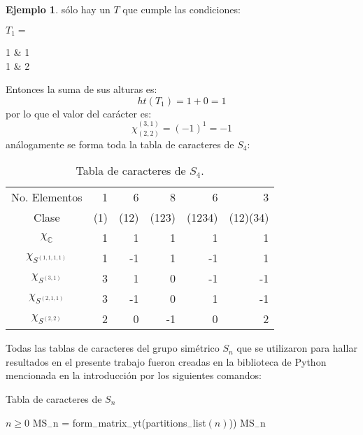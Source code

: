 \documentclass[12pt]{book}
\theoremstyle{definition}
\newtheorem{example}[theorem]{Ejemplo}
\newcounter{in}
\begin{document}
\begin{example}
sólo hay un $T$ que cumple las condiciones:
\begin{center}  
  $T_1=$
  \begin{ytableau}
    1 & 1  \\
    1 & 2
  \end{ytableau}\qquad
\end{center}
Entonces la suma de sus alturas es:
$$ht(T_1) = 1 + 0 = 1$$
por lo que el valor del carácter es:
$$\chi_{(2,2)}^{(3,1)} = (-1)^{1} = -1$$
análogamente se forma toda la tabla de caracteres de $S_{4}$:
\begin{table}[H]
  \centering
  \begin{tabular}{c|r r r r r}
    No. Elementos & 1 & 6 & 8 & 6 & 3 \\
    Clase & (1) & (12) & (123) & (1234) &(12)(34)\\
    \hline
    $\chi_{\mathbb{C}}$ & 1 & 1 & 1 & 1 & 1 \\
    $\chi_{S^{(1,1,1,1)}}$ & 1 & -1 & 1 & -1 & 1\\
    $\chi_{S^{(3,1)}}$ & 3 & 1 & 0 & -1 & -1\\
    $\chi_{S^{(2,1,1)}}$ & 3 & -1 & 0 & 1 & -1 \\
    $\chi_{S^{(2,2)}}$ & 2 & 0 & -1 & 0 & 2 
\end{tabular}
    \caption{Tabla de caracteres de $S_{4}$.}
\label{tab:S_4}
\end{table}
\end{example}
Todas las tablas de caracteres del grupo simétrico $S_n$ que se
utilizaron para hallar resultados en el presente trabajo fueron
creadas en la biblioteca de Python mencionada en la introducción
por los siguientes comandos:
\begin{algorithm}[H]
\caption{Tabla de caracteres de $S_n$}
\begin{algorithmic}
\REQUIRE $n \geq 0$
\STATE MS$_{-}$n = form$_{-}$matrix$_{-}$yt(partitions$_{-}$list$(n)$))
\PRINT MS$_{-}$n
\end{algorithmic}
\end{algorithm}
\end{document}
